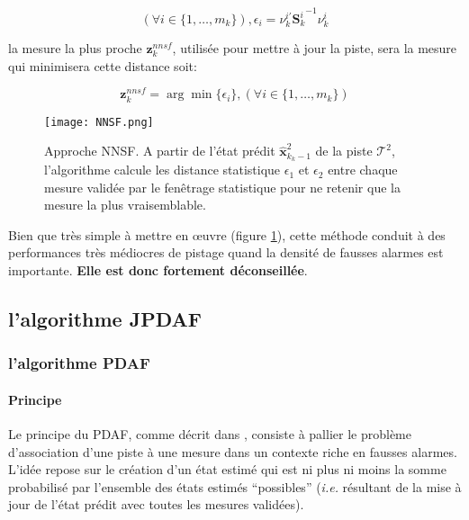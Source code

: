 \documentclass[10pt,french,a4paper]{report}
\begin{document}
	 	 					\begin{equation}
	 	 					(\forall i \in \{1,\ldots,m_k\}),  
	\epsilon_i =\nu_k^{i'}{\mathbf{S}_k^i}^{-1}\nu_k^i
							\end{equation}
	
la mesure la plus proche $\mathbf{z}_k^{nnsf}$, utilisée pour mettre à jour la piste, sera la mesure qui minimisera cette distance soit:
	
	 	 					\begin{equation}
	 	 					\mathbf{z}_k^{nnsf} = \arg\min\{ \epsilon_i \},  (\forall i \in \{1,\ldots,m_k\})
							\end{equation} 
							

\begin{figure}
\begin{center}
\texttt{[image: NNSF.png]}
\caption{Approche \acf{NNSF}. A partir de l'état prédit $\hat{\mathbf{x}}_{k_k-1}^2$ de la piste $\mathcal{T}^2$, l'algorithme calcule les distance statistique $\epsilon_1$ et $\epsilon_2$ entre chaque mesure validée par le fenêtrage statistique pour ne retenir que la mesure la plus vraisemblable.}
\label{fig:NNSF} 
\end{center}
\end{figure}

							
							
							
							Bien que très simple à mettre en \oe uvre (figure \ref{fig:NNSF}), cette méthode conduit à des performances très médiocres de pistage quand la densité de fausses alarmes est importante. \textbf{Elle est donc fortement déconseillée}.		
									
							
									\subsection{l'algorithme \acf{JPDAF}}
									\subsubsection{l'algorithme PDAF}
			
  
			
			\paragraph{Principe}
			Le principe du \acf{PDAF}, comme décrit dans \cite{BarShalom2009},  consiste à pallier le problème d'association d'une piste à une mesure dans un contexte riche en fausses alarmes. L'idée repose sur le création d'un état estimé qui est ni plus ni moins la somme probabilisé par l'ensemble des états estimés ``possibles'' (\textit{i.e.} résultant de la mise à jour de l'état prédit avec toutes les mesures validées).  
			
\end{document}
